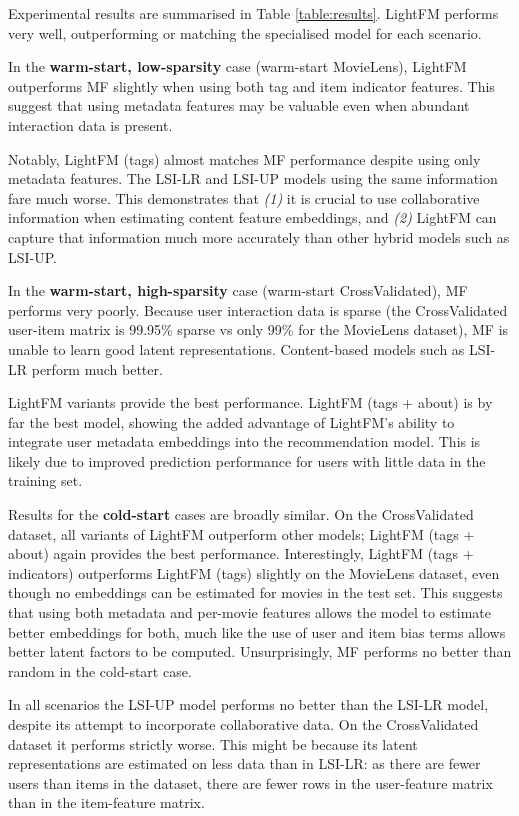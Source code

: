 \documentclass{sig-alternate}
\begin{document}
Experimental results are summarised in Table \ref{table:results}. LightFM performs very well, outperforming or matching the specialised model for each scenario.

In the \textbf{warm-start, low-sparsity} case (warm-start MovieLens), LightFM outperforms MF slightly when using both tag and item indicator features. This suggest that using metadata features may be valuable even when abundant interaction data is present.

Notably, LightFM (tags) almost matches MF performance despite using only metadata features. The LSI-LR and LSI-UP models using the same information fare much worse. This demonstrates that \textit{(1)} it is crucial to use collaborative information when estimating content feature embeddings, and \textit{(2)} LightFM can capture that information much more accurately than other hybrid models such as LSI-UP.

In the \textbf{warm-start, high-sparsity} case (warm-start CrossValidated), MF performs very poorly. Because user interaction data is sparse (the CrossValidated user-item matrix is 99.95\% sparse vs only 99\% for the MovieLens dataset), MF is unable to learn good latent representations. Content-based models such as LSI-LR perform much better. 

LightFM variants provide the best performance. LightFM (tags + about) is by far the best model, showing the added advantage of LightFM's ability to integrate user metadata embeddings into the recommendation model. This is likely due to improved prediction performance for users with little data in the training set.

Results for the \textbf{cold-start} cases are broadly similar. On the CrossValidated dataset, all variants of LightFM outperform other models; LightFM (tags + about) again provides the best performance. Interestingly, LightFM (tags + indicators) outperforms LightFM (tags) slightly on the MovieLens dataset, even though no embeddings can be estimated for movies in the test set. This suggests that using both metadata and per-movie features allows the model to estimate better embeddings for both, much like the use of user and item bias terms allows better latent factors to be computed. Unsurprisingly, MF performs no better than random in the cold-start case.

In all scenarios the LSI-UP model performs no better than the LSI-LR model, despite its attempt to incorporate collaborative data. On the CrossValidated dataset it performs strictly worse. This might be because its latent representations are estimated on less data than in LSI-LR: as there are fewer users than items in the dataset, there are fewer rows in the user-feature matrix than in the item-feature matrix.
\end{document}
